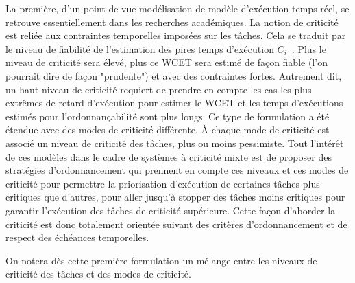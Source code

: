 \documentclass[french, a4paper, 11pt, twoside, pdftex]{StyleThese}
\begin{document}
    La première, d'un point de vue modélisation de modèle d'exécution temps-réel, se retrouve essentiellement dans les recherches académiques. La notion de criticité est reliée aux contraintes temporelles imposées sur les tâches. Cela se traduit par le niveau de fiabilité de l'estimation des pires temps d'exécution $C_i$~\cite{vestal_preemptive_2007}. 
    Plus le niveau de criticité sera élevé, plus ce WCET sera estimé de façon fiable (l'on pourrait dire de façon "prudente") et avec des contraintes fortes. Autrement dit, un haut niveau de criticité requiert de prendre en compte les cas les plus extrêmes de retard d'exécution pour estimer le WCET et les temps d'exécutions estimés pour l'ordonnançabilité sont plus longs. Ce type de formulation a été étendue avec des modes de criticité différente. À chaque mode de criticité est associé un niveau de criticité des tâches, plus ou moins pessimiste.
    Tout l'intérêt de ces modèles  dans le cadre de systèmes à criticité mixte est de proposer des stratégies d'ordonnancement qui prennent en compte ces niveaux et ces modes de criticité pour permettre la priorisation d'exécution de certaines tâches plus critiques que d'autres, pour aller jusqu'à stopper des tâches moins critiques pour garantir l'exécution des tâches de criticité supérieure. Cette façon d'aborder la criticité est donc totalement orientée suivant des critères d'ordonnancement et de respect des échéances temporelles.
    
    On notera dès cette première formulation un mélange entre les niveaux de criticité des tâches et des modes de criticité. 
    
\end{document}
